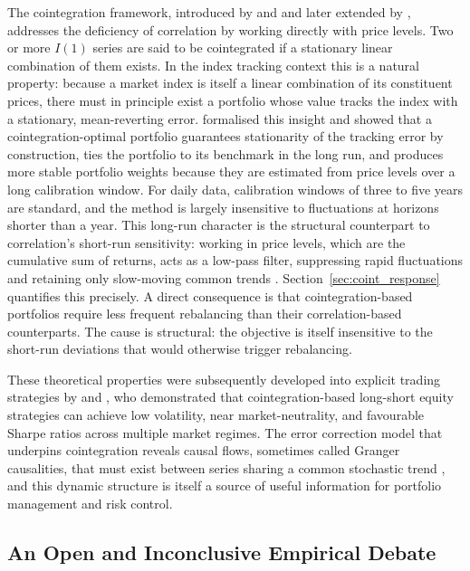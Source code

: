 \documentclass[12pt,a4paper]{article}
\begin{document}
The cointegration framework, introduced by \citet{Granger1981} and
\citet{EngleGranger1987} and later extended by \citet{Johansen1988,
Johansen1991}, addresses the deficiency of correlation by working
directly with price levels. Two or more $I(1)$ series are said to be
cointegrated if a stationary linear combination of them exists. In the
index tracking context this is a natural property: because a market index
is itself a linear combination of its constituent prices, there must in
principle exist a portfolio whose value tracks the index with a
stationary, mean-reverting error. \citet{Alexander1999} formalised this
insight and showed that a cointegration-optimal portfolio guarantees
stationarity of the tracking error by construction, ties the portfolio to
its benchmark in the long run, and produces more stable portfolio weights
because they are estimated from price levels over a long calibration
window. For daily data, calibration windows of three to five years are
standard, and the method is largely insensitive to fluctuations at
horizons shorter than a year. This long-run character is the structural
counterpart to correlation's short-run sensitivity: working in price
levels, which are the cumulative sum of returns, acts as a low-pass
filter, suppressing rapid fluctuations and retaining only slow-moving
common trends \citep{ChaudhuriLo2016}. Section~\ref{sec:coint_response} quantifies this
precisely. A direct consequence is that cointegration-based portfolios
require less frequent rebalancing than their correlation-based
counterparts. The cause is structural: the objective is itself
insensitive to the short-run deviations that would otherwise trigger
rebalancing.

These theoretical properties were subsequently developed into explicit
trading strategies by \citet{AlexanderGiblinWeddington2002} and
\citet{AlexanderDimitriu2002, AlexanderDimitriu2005a,
AlexanderDimitriu2005b}, who demonstrated that cointegration-based
long-short equity strategies can achieve low volatility, near
market-neutrality, and favourable Sharpe ratios across multiple market
regimes. The error correction model that underpins cointegration reveals
causal flows, sometimes called Granger causalities, that must exist
between series sharing a common stochastic trend \citep{Granger1988}, and
this dynamic structure is itself a source of useful information for
portfolio management and risk control.

\subsection{An Open and Inconclusive Empirical Debate}
\label{sec:litreview}
\end{document}
